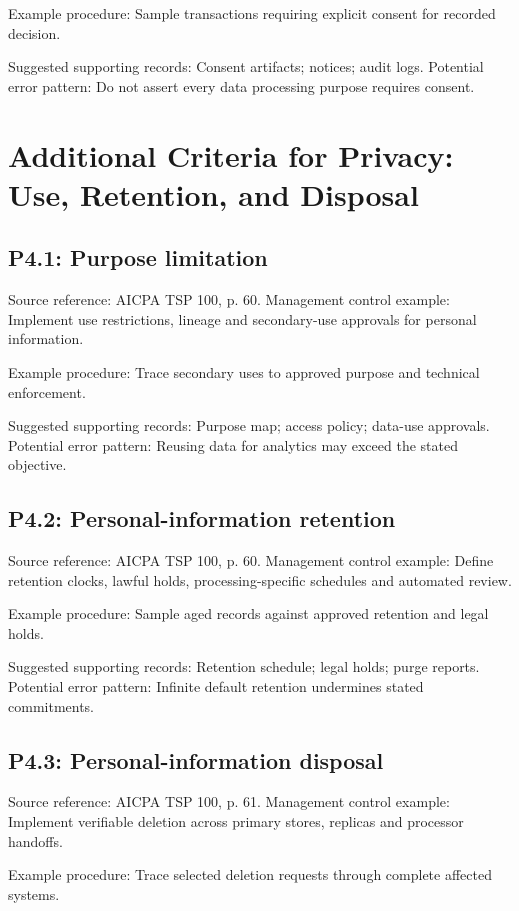 \documentclass[10pt,oneside]{report}
\begin{document}
Example procedure: Sample transactions requiring explicit consent for recorded decision.

Suggested supporting records: Consent artifacts; notices; audit logs. Potential error pattern: Do not assert every data processing purpose requires consent.

\section{Additional Criteria for Privacy: Use, Retention, and Disposal}
\subsection*{P4.1: Purpose limitation}
Source reference: AICPA TSP 100, p. 60. Management control example: Implement use restrictions, lineage and secondary-use approvals for personal information.

Example procedure: Trace secondary uses to approved purpose and technical enforcement.

Suggested supporting records: Purpose map; access policy; data-use approvals. Potential error pattern: Reusing data for analytics may exceed the stated objective.

\subsection*{P4.2: Personal-information retention}
Source reference: AICPA TSP 100, p. 60. Management control example: Define retention clocks, lawful holds, processing-specific schedules and automated review.

Example procedure: Sample aged records against approved retention and legal holds.

Suggested supporting records: Retention schedule; legal holds; purge reports. Potential error pattern: Infinite default retention undermines stated commitments.

\subsection*{P4.3: Personal-information disposal}
Source reference: AICPA TSP 100, p. 61. Management control example: Implement verifiable deletion across primary stores, replicas and processor handoffs.

Example procedure: Trace selected deletion requests through complete affected systems.
\end{document}
